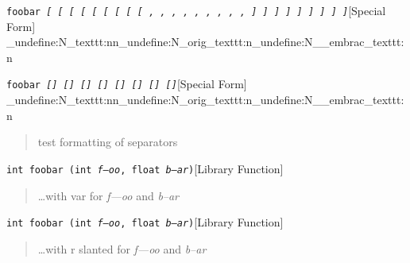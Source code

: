 \documentclass{book}
\newcommand\GNUTexinfocommandstyletextvar[1]{{\normalfont{}\textsl{#1}}}%
\begin{document}
\noindent\texttt{foobar \EmbracOn{}\textnormal{\textsl{[ \EmbracOff{}\textnormal{[}\EmbracOn{} \textsl{[} \texttt{[} \texttt{[} \EmbracOff{}\textnormal{\textsl{[}}\EmbracOn{} \EmbracOff{}\textnormal{\texttt{[}}\EmbracOn{} \EmbracOff{}\textnormal{\texttt{\textsl{[}}}\EmbracOn{} \EmbracOff{}\textnormal{\texttt{[}}\EmbracOn{} , \EmbracOff{}\textnormal{,}\EmbracOn{} \textsl{,} \texttt{,} \texttt{,} \EmbracOff{}\textnormal{\textsl{,}}\EmbracOn{} \EmbracOff{}\textnormal{\texttt{,}}\EmbracOn{} \EmbracOff{}\textnormal{\texttt{\textsl{,}}}\EmbracOn{} \EmbracOff{}\textnormal{\texttt{,}}\EmbracOn{} ] \EmbracOff{}\textnormal{]}\EmbracOn{} \textsl{]} \texttt{]} \texttt{]} \EmbracOff{}\textnormal{\textsl{]}}\EmbracOn{} \EmbracOff{}\textnormal{\texttt{]}}\EmbracOn{} \EmbracOff{}\textnormal{\texttt{\textsl{]}}}\EmbracOn{} \EmbracOff{}\textnormal{\texttt{]}}\EmbracOn{}}}\EmbracOff{}}\hfill[Special Form]
\ExplSyntaxOn%
\cs_undefine:N{\embrac_texttt:nn}\cs_undefine:N{\embrac_orig_texttt:n}\cs_undefine:N{\__embrac_texttt:n}%
\ExplSyntaxOff%

%
\noindent\texttt{foobar \EmbracOn{}\textnormal{\textsl{[] \EmbracOff{}\textnormal{[]}\EmbracOn{} \textsl{[]} \texttt{[]} \texttt{[]} \EmbracOff{}\textnormal{\textsl{[]}}\EmbracOn{} \EmbracOff{}\textnormal{\texttt{[]}}\EmbracOn{} \EmbracOff{}\textnormal{\texttt{\textsl{[]}}}\EmbracOn{}}}\EmbracOff{}}\hfill[Special Form]
\ExplSyntaxOn%
\cs_undefine:N{\embrac_texttt:nn}\cs_undefine:N{\embrac_orig_texttt:n}\cs_undefine:N{\__embrac_texttt:n}%
\ExplSyntaxOff%

%
\begin{quote}
\unskip{\parskip=0pt\noindent}%
test formatting of separators
\end{quote}

\noindent\texttt{int foobar (int \GNUTexinfocommandstyletextvar{f---oo}, float \GNUTexinfocommandstyletextvar{b--ar})}\hfill[Library Function]

%
\begin{quote}
\unskip{\parskip=0pt\noindent}%
\dots{}\@ with var for \GNUTexinfocommandstyletextvar{f---oo} and \GNUTexinfocommandstyletextvar{b--ar}
\end{quote}

\noindent\texttt{int foobar (int \textnormal{\textsl{f---oo}}, float \textnormal{\textsl{b--ar}})}\hfill[Library Function]

%
\begin{quote}
\unskip{\parskip=0pt\noindent}%
\dots{}\@ with r slanted for \GNUTexinfocommandstyletextvar{f---oo} and \GNUTexinfocommandstyletextvar{b--ar}
\end{quote}
\end{document}
